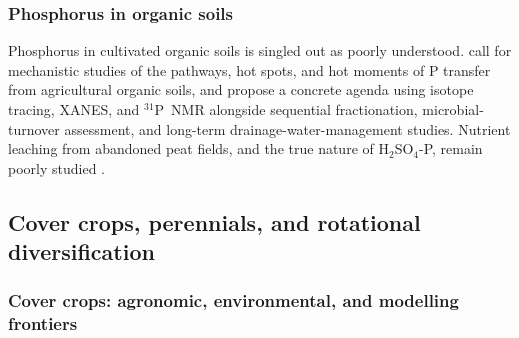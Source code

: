 \documentclass[11pt]{article}
\begin{document}
\subsubsection{Phosphorus in organic soils}

Phosphorus in cultivated organic soils is singled out as poorly understood.
\textcite{Grenon2022} call for mechanistic studies of the pathways, hot spots,
and hot moments of P transfer from agricultural organic soils, and
\textcite{Grenon2021} propose a concrete agenda using isotope tracing, XANES,
and $^{31}$P~NMR alongside sequential fractionation, microbial-turnover
assessment, and long-term drainage-water-management studies. Nutrient leaching
from abandoned peat fields, and the true nature of H$_2$SO$_4$-P, remain poorly
studied \parencite{Höyhtyä2025}.

\subsection{Cover crops, perennials, and rotational diversification}

\subsubsection{Cover crops: agronomic, environmental, and modelling frontiers}
\end{document}
